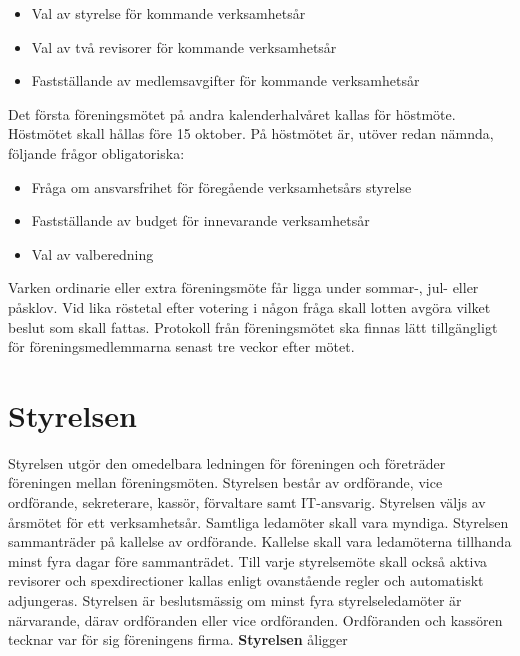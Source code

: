 \documentclass[a4paper]{article}
\begin{document}
\begin{itemize}
  \item Val av styrelse för kommande verksamhetsår
  \item Val av två revisorer för kommande verksamhetsår
  \item Fastställande av medlemsavgifter för kommande verksamhetsår
\end{itemize}

\noindent
Det första föreningsmötet på andra kalenderhalvåret kallas för höstmöte. Höstmötet skall hållas före 15 oktober.\newline
\newline
På höstmötet är, utöver redan nämnda, följande frågor obligatoriska:

\begin{itemize}
  \item Fråga om ansvarsfrihet för föregående verksamhetsårs styrelse
  \item Fastställande av budget för innevarande verksamhetsår
  \item Val av valberedning
\end{itemize}

\noindent
Varken ordinarie eller extra föreningsmöte får ligga under sommar-, jul- eller påsklov.\newline
\newline
Vid lika röstetal efter votering i någon fråga skall lotten avgöra vilket beslut som skall fattas.\newline
\newline
Protokoll från föreningsmötet ska finnas lätt tillgängligt för föreningsmedlemmarna senast tre veckor efter mötet.

\section{Styrelsen}
\label{section:styrelsen}
Styrelsen utgör den omedelbara ledningen för föreningen och företräder föreningen mellan föreningsmöten.\newline
\newline
Styrelsen består av ordförande, vice ordförande, sekreterare, kassör, förvaltare samt IT-ansvarig.\newline
\newline
Styrelsen väljs av årsmötet för ett verksamhetsår. Samtliga ledamöter skall vara myndiga.\newline
\newline
Styrelsen sammanträder på kallelse av ordförande. Kallelse skall vara ledamöterna tillhanda minst fyra dagar före sammanträdet. Till varje styrelsemöte skall också aktiva revisorer och spexdirectioner kallas enligt ovanstående regler och automatiskt adjungeras.\newline
\newline
Styrelsen är beslutsmässig om minst fyra styrelseledamöter är närvarande, därav ordföranden eller vice ordföranden.\newline
\newline
Ordföranden och kassören tecknar var för sig föreningens firma.\newline
\newline
\textbf{Styrelsen} åligger
\end{document}
